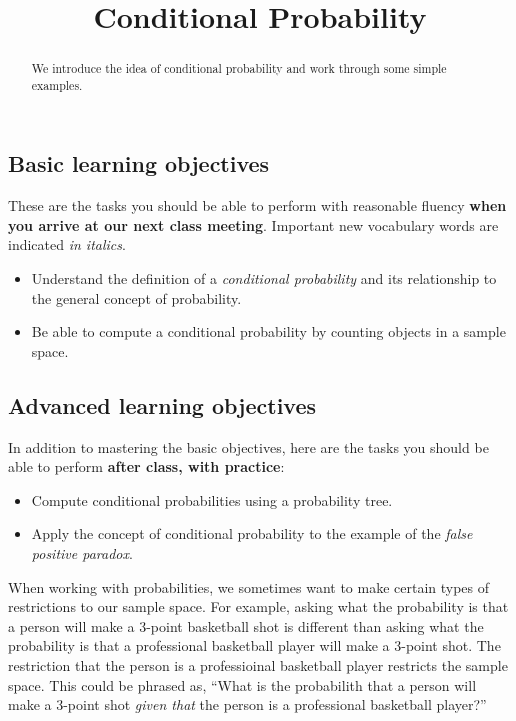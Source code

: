 \documentclass{ximera}
\title{Conditional Probability}
\begin{document}
\begin{abstract}
We introduce the idea of conditional probability and work through some simple examples.
\end{abstract}
\maketitle

\subsection*{Basic learning objectives}

These are the tasks you should be able to perform with reasonable fluency \textbf{when you arrive at our next class meeting}. Important new vocabulary words are indicated \emph{in italics}. 

\begin{itemize}
	\item Understand the definition of a \emph{conditional probability} and its relationship to the general concept of probability.
    \item Be able to compute a conditional probability by counting objects in a sample space.
\end{itemize}

\subsection*{Advanced learning objectives}

In addition to mastering the basic objectives, here are the tasks you should be able to perform \textbf{after class, with practice}: 

\begin{itemize}
    \item Compute conditional probabilities using a probability tree.
    \item Apply the concept of conditional probability to the example of the \emph{false positive paradox}.
\end{itemize}

\noindent\hrulefill

When working with probabilities, we sometimes want to make certain types of restrictions to our sample space. For example, asking what the probability is that a person will make a 3-point basketball shot is different than asking what the probability is that a professional basketball player will make a 3-point shot. The restriction that the person is a professioinal basketball player restricts the sample space. This could be phrased as, ``What is the probabilith that a person will make a 3-point shot \emph{given that} the person is a professional basketball player?''
\end{document}
